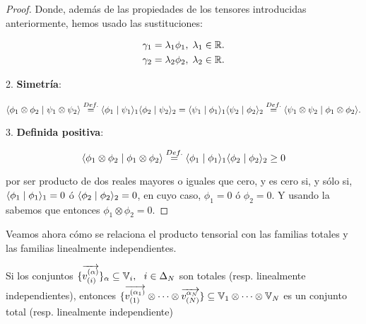 \begin{proof}
    Donde, además de las propiedades de los tensores introducidas anteriormente, hemos usado las sustituciones:

    \begin{equation}
    \begin{split}
        \gamma_1 &= \lambda_1 \phi_1, \; \lambda_1 \in \R. \\
        \gamma_2 &= \lambda_2 \phi_2, \; \lambda_2 \in \R. \\
    \end{split}
    \end{equation}

    2. \textbf{Simetría}:

    \begin{equation}
        \innerproduct{\phi_1 \otimes \phi_2}{\psi_1 \otimes \psi_2} \encima{=}{Def.} \innerproduct{\phi_1}{\psi_1}_1 \innerproduct{\phi_2}{\psi_2}_2 =  \innerproduct{\psi_1}{\phi_1}_1 \innerproduct{\psi_2}{\phi_2}_2 \encima{=}{Def.} \innerproduct{\psi_1 \otimes \psi_2}{\phi_1 \otimes \phi_2}.
    \end{equation}

    3. \textbf{Definida positiva}:

    \begin{equation}
        \innerproduct{\phi_1 \otimes \phi_2}{\phi_1 \otimes \phi_2} \encima{=}{Def.} \innerproduct{\phi_1}{\phi_1}_1 \innerproduct{\phi_2}{\phi_2}_2 \geq 0
    \end{equation}

    por ser producto de dos reales mayores o iguales que cero, y es cero si, y sólo si, $\innerproduct{\phi_1}{\phi_1}_1 = 0$ ó $\innerproduct{\phi_2}{\phi_2}_2 = 0$, en cuyo caso, $\phi_1 = 0$ ó $\phi_2 = 0$. Y usando la  sabemos que entonces $\phi_1 \otimes \phi_2 = 0$.

\end{proof}

Veamos ahora cómo se relaciona el producto tensorial con las familias totales y las familias linealmente independientes.

\begin{proposicion} \label{prop:conservacion_totalidad_indp_lineal_general}
	Si los conjuntos $\{\nv{v_{(i)}^{(\alpha)}}\}_{\alpha} \subseteq \mathbb{V}_i, \dspace i \in \deltaset{N}$ son totales (resp. linealmente independientes), entonces $\{ \nv{v^{(\alpha_1)}_{(1)}} \otimes \cdots \otimes  \nv{v^{\alpha_N}_{(N)}}  \} \subseteq \mathbb{V}_1 \otimes \cdots \otimes \mathbb{V}_N$ es un conjunto total (resp. linealmente independiente)
\end{proposicion}

